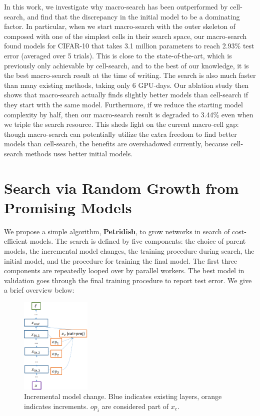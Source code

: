 \documentclass{article}
\newcommand{\Petridish}{Petridish\xspace}
\begin{document}
In this work, we investigate why macro-search has been outperformed by cell-search, and find that the discrepancy in the initial model to be a dominating factor. In particular, when we start macro-search with the outer skeleton of~\citet{NASCell} composed with one of the simplest cells in their search space, our macro-search found models for CIFAR-10 that takes 3.1 million parameters to reach 2.93\% test error (averaged over 5 trials). This is close to the state-of-the-art, which is previously only achievable by cell-search, and to the best of our knowledge, it is the best macro-search result at the time of writing. The search is also much faster than many existing methods, taking only 6 GPU-days. 
Our ablation study then shows that macro-search actually finds slightly better models than cell-search if they start with the same model. Furthermore, if we reduce the starting model complexity by half, then our macro-search result is degraded to 3.44\% even when we triple the search resource. This sheds light on the current macro-cell gap: though macro-search can potentially utilize the extra freedom to find better models than cell-search, the benefits are overshadowed currently, because cell-search methods uses better initial models. 

\section{Search via Random Growth from Promising Models}
\label{sec:search_algorithm}

We propose a simple algorithm, \textbf{\Petridish}, to grow networks in search of cost-efficient models. The search is defined by five components: the choice of parent models, the incremental model changes, the training procedure during search, the initial model, and the procedure for training the final model. The first three components are repeatedly looped over by parallel workers. The best model in validation goes through the final training procedure to report test error. We give a brief overview below:

\begin{figure}
\centering
    \includegraphics[width=0.3\textwidth, keepaspectratio]{img/hallu_soft.png}
    \caption{Incremental model change. Blue indicates existing layers, orange indicates increments. $op_i$ are considered part of $x_c$.}
    \label{fig:hallu_soft}
\end{figure}
\end{document}
